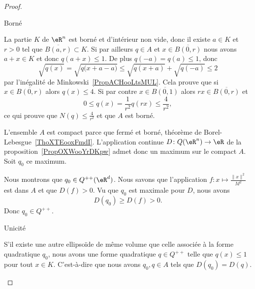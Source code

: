\begin{proof}
\begin{subproof}
\begin{subproof}
        \item[Borné]

            La partie \( K\) de \( \eR^n\) est borné et d'intérieur non vide, donc il existe \( a\in K\) et \( r>0\) tel que \( \overline{ B(a,r) }\subset K\). Si par ailleurs \( q\in A\) et \( x\in\overline{ B(0,r) }\) nous avons \( a+x\in K\) et donc \( q(a+x)\leq 1\). De plus \( q(-a)=q(a)\leq 1\), donc
            \begin{equation}
                \sqrt{q(x)}=\sqrt{q\big( x+a-a \big)}\leq \sqrt{q(x+a)}+\sqrt{q(-a)}\leq 2
            \end{equation}
            par l'inégalité de Minkowski~\ref{PropACHooLtsMUL}. Cela prouve que si \( x\in\overline{ B(0,r) }\) alors \( q(x)\leq 4\). Si par contre \( x\in\overline{ B(0,1) }\) alors \( rx\in\overline{ B(0,r) } \) et
            \begin{equation}
                0\leq q(x)=\frac{1}{ r^2 }q(rx)\leq \frac{ 4 }{ r^2 },
            \end{equation}
            ce qui prouve que \( N(q)\leq \frac{ 4 }{ r^2 }\) et que \( A\) est borné.


            \end{subproof}

            L'ensemble \( A\) est compact parce que fermé et borné, théorème de Borel-Lebesgue~\ref{ThoXTEooxFmdI}. L'application continue \( D\colon Q(\eR^n)\to \eR\) de la proposition~\ref{PropOXWooYrDKpw} admet donc un maximum sur le compact \( A\). Soit \( q_0\) ce maximum.

            Nous montrons que \( q_0\in Q^{++}(\eR^d)\). Nous savons que l'application \( f\colon x\mapsto \frac{ \| x \|^2 }{ M^2 }\) est dans \( A\) et que \( D(f)>0\). Vu que \( q_0\) est maximale pour \( D\), nous avons
            \begin{equation}
                D(q_0)\geq D(f)>0.
            \end{equation}
            Donc \( q_0\in Q^{++}\).

        \item[Unicité]

            S'il existe une autre ellipsoïde de même volume que celle associée à la forme quadratique \( q_0\), nous avons une forme quadratique \( q\in Q^{++}\) telle que \( q(x)\leq 1\) pour tout \( x\in K\). C'est-à-dire que nous avons \( q_0,q\in A\) tels que \( D(q_0)=D(q)\).


\end{subproof}
\end{proof}
